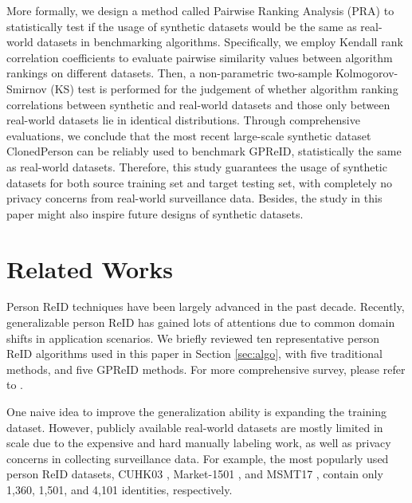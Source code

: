 \documentclass[10pt,twocolumn,letterpaper]{article}
\begin{document}
More formally, we design a method called Pairwise Ranking Analysis (PRA) to statistically test if the usage of synthetic datasets would be the same as real-world datasets in benchmarking algorithms. Specifically, we employ Kendall rank correlation coefficients to evaluate pairwise similarity values between algorithm rankings on different datasets. Then, a non-parametric two-sample Kolmogorov-Smirnov (KS) test is performed for the judgement of whether algorithm ranking correlations between synthetic and real-world datasets and those only between real-world datasets lie in identical distributions. Through comprehensive evaluations, we conclude that the most recent large-scale synthetic dataset ClonedPerson can be reliably used to benchmark GPReID, statistically the same as real-world datasets. Therefore, this study guarantees the usage of synthetic datasets for both source training set and target testing set, with completely no privacy concerns from real-world surveillance data. Besides, the study in this paper might also inspire future designs of synthetic datasets.


\section{Related Works}





Person ReID techniques have been largely advanced in the past decade. Recently, generalizable person ReID has gained lots of attentions due to common domain shifts in application scenarios. We briefly reviewed ten representative person ReID algorithms used in this paper in Section \ref{sec:algo}, with five traditional methods, and five GPReID methods. For more comprehensive survey, please refer to \cite{gong2014person,WU2019neuro,ye2022survey}.

One naive idea to improve the generalization ability is expanding the training dataset. However, publicly available real-world datasets are mostly limited in scale due to the expensive and hard manually labeling work, as well as privacy concerns in collecting surveillance data. For example, the most popularly used person ReID datasets, CUHK03 \cite{li2014deepreid}, Market-1501 \cite{zheng2015scalable}, and MSMT17 \cite{wei2018person}, contain only 1,360, 1,501, and 4,101 identities, respectively. 
\end{document}
